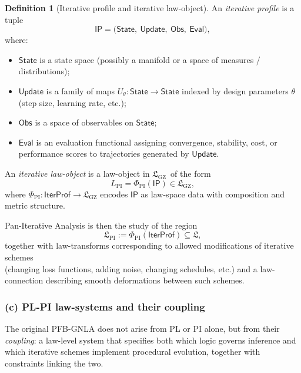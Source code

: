 \documentclass[11pt]{book}
\theoremstyle{plain}
\theoremstyle{definition}
\newtheorem{definition}[theorem]{Definition} \theoremstyle{remark}
\newcommand{\GZLS}{\ensuremath{\mathfrak{L}_{\mathrm{GZ}}}}       \newcommand{\GZLT}{\ensuremath{M_{!w}}}                           \newcommand{\GZLOC}{\ensuremath{A_M}}                             \newcommand{\GZLCurv}{\ensuremath{\mathcal{F}_{\mathrm{law}}}}
\begin{document}
\begin{definition}[Iterative profile and iterative law-object]
An \emph{iterative profile} is a tuple
  \[
    \mathsf{IP}
    =
    \bigl(
      \mathsf{State},\ \mathsf{Update},\ \mathsf{Obs},\ \mathsf{Eval}
    \bigr),
  \]
  where:
  \begin{itemize}
    \item $\mathsf{State}$ is a state space (possibly a manifold or a
          space of measures / distributions);
    \item $\mathsf{Update}$ is a family of maps
          $U_\theta:\mathsf{State}\to\mathsf{State}$ indexed by
          design parameters $\theta$ (step size, learning rate, etc.);
    \item $\mathsf{Obs}$ is a space of observables on
          $\mathsf{State}$;
    \item $\mathsf{Eval}$ is an evaluation functional assigning
          convergence, stability, cost, or performance scores to
          trajectories generated by $\mathsf{Update}$.
  \end{itemize}
  An \emph{iterative law-object} is a law-object in \GZLS\ of the form
  \[
    L_{\mathrm{PI}}
    =
    \Phi_{\mathrm{PI}}(\mathsf{IP})
    \in\GZLS,
  \]
  where
  \(
    \Phi_{\mathrm{PI}}:\mathsf{IterProf}\to\GZLS
  \)
  encodes $\mathsf{IP}$ as law-space data with composition and metric
  structure.
\end{definition}

Pan-Iterative Analysis is then the study of the region
\[
   \mathfrak{L}_{\mathrm{PI}}
   :=
   \Phi_{\mathrm{PI}}(\mathsf{IterProf})
   \subseteq\mathfrak{L},
\]
together with law-transforms corresponding to allowed modifications of
iterative schemes \\ (changing loss functions, adding noise, changing
schedules, etc.) and a law-connection describing smooth deformations
between such schemes.



\subsubsection*{(c) PL-PI law-systems and their coupling}

The original PFB-GNLA does not arise from PL or PI alone, but from
their \emph{coupling}: a law-level system that specifies both which
logic governs inference and which iterative schemes implement
procedural evolution, together with constraints linking the two.
\end{document}
